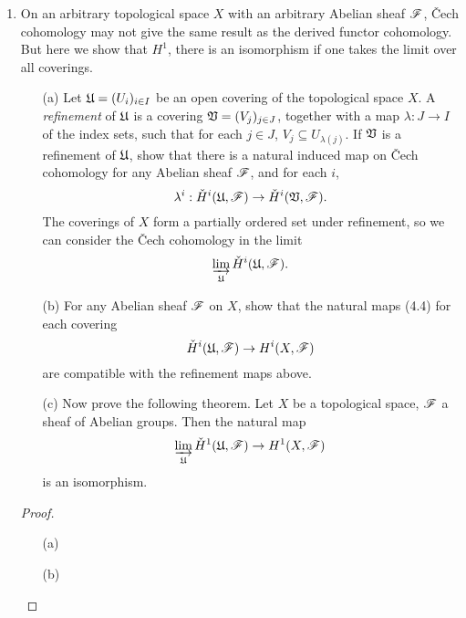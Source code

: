 \documentclass{article}
\begin{document}
\begin{enumerate} [label=\textbf{\arabic*.}, leftmargin=0em]
\item On an arbitrary topological space $X$ with an arbitrary Abelian sheaf $\mathscr{F}$, Čech cohomology may not give the same result as the derived functor cohomology.
But here we show that $H^1$, there is an isomorphism if one takes the limit over all coverings.
\begin{itemize}
  \item[(a)] Let $\mathfrak{U} = (U_i)_{i \in I}$ be an open covering of the topological space $X$.
  A \textit{refinement} of $\mathfrak{U}$ is a covering $\mathfrak{V} = (V_j)_{j \in J}$, together with a map $\lambda : J \to I$ of the index sets, such that for each $j \in J$, $V_j \subseteq U_{\lambda(j)}$.
  If $\mathfrak{V}$ is a refinement of $\mathfrak{U}$, show that there is a natural induced map on Čech cohomology for any Abelian sheaf $\mathscr{F}$, and for each $i$,
  \begin{equation*}
    \lambda^i : \check{H}^i(\mathfrak{U}, \mathscr{F}) \to \check{H}^i(\mathfrak{V}, \mathscr{F}).
  \end{equation*}
  The coverings of $X$ form a partially ordered set under refinement, so we can consider the Čech cohomology in the limit
  \begin{equation*}
    \varinjlim_{\mathfrak{U}} \check{H}^i(\mathfrak{U}, \mathscr{F}).
  \end{equation*}

  \item[(b)]  For any Abelian sheaf $\mathscr{F}$ on $X$, show that the natural maps (4.4) for each covering
  \begin{equation*}
    \check{H}^i(\mathfrak{U}, \mathscr{F}) \to H^i(X, \mathscr{F})
  \end{equation*}
  are compatible with the refinement maps above.

  \item[(c)] Now prove the following theorem.
  Let $X$ be a topological space, $\mathscr{F}$ a sheaf of Abelian groups.
  Then the natural map
  \begin{equation*}
    \varinjlim_{\mathfrak{U}} \check{H}^1(\mathfrak{U}, \mathscr{F}) \to H^1(X, \mathscr{F})
  \end{equation*}
  is an isomorphism.
\end{itemize}

\begin{proof} $ $ \vspace{0pt}
  \begin{itemize} [leftmargin=0cm]
    \item[(a)]

    \item[(b)]


\end{itemize}
\end{proof}
\end{enumerate}
\end{document}
